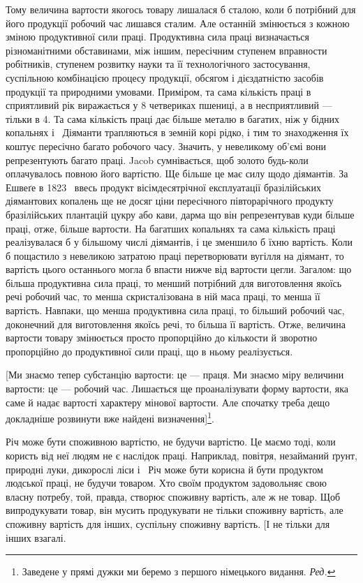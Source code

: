 Тому величина вартости якогось товару лишалася б сталою,
коли б потрібний для його продукції робочий час лишався сталим.
Але останній змінюється з кожною зміною продуктивної
сили праці. Продуктивна сила праці визначається різноманітними
обставинами, між іншим, пересічним ступенем вправности робітників,
ступенем розвитку науки та її технологічного застосування,
суспільною комбінацією процесу продукції, обсягом і дієздатністю
засобів продукції та природними умовами. Приміром, та сама
кількість праці в сприятливий рік виражається у 8 четвериках
пшениці, а в несприятливий — тільки в 4. Та сама кількість праці
дає більше металю в багатих, ніж у бідних копальнях і~
Діяманти трапляються в земній корі рідко, і тим то знаходження
їх коштує пересічно багато робочого часу. Значить, у невеликому
об’ємі вони репрезентують багато праці. Jacob сумнівається, щоб
золото будь-коли оплачувалось повною його вартістю. Ще
більше це має силу щодо діямантів. За Ешвеґе в 1823~ ввесь
продукт вісімдесятрічної експлуатації бразілійських діямантових
копалень ще не досяг ціни пересічного півторарічного продукту
бразілійських плантацій цукру або кави, дарма що він репрезентував
куди більше праці, отже, більше вартости. На багатших
копальнях та сама кількість праці реалізувалася б у більшому
числі діямантів, і це зменшило б їхню вартість. Коли б пощастило
з невеликою затратою праці перетворювати вугілля на діямант,
то вартість цього останнього могла б впасти нижче від вартости
цегли. Загалом: що більша продуктивна сила праці, то менший
потрібний для виготовлення якоїсь речі робочий час, то менша
скристалізована в ній маса праці, то менша її вартість. Навпаки,
що менша продуктивна сила праці, то більший робочий час, доконечний
для виготовлення якоїсь речі, то більша її вартість.
Отже, величина вартости товару змінюється просто пропорційно
до кількости й зворотно пропорційно до продуктивної сили праці,
що в ньому реалізується.

[Ми знаємо тепер субстанцію вартости: це — праця. Ми знаємо
міру величини вартости: це — робочий час. Лишається ще проаналізувати
форму вартости, яка саме й надає вартості характеру
мінової вартости. Але спочатку треба дещо докладніше розвинути
вже найдені визначення]\footnote*{
Заведене у прямі дужки ми беремо з першого німецького видання. \emph{Ред.}
}.

Річ може бути споживною вартістю, не будучи вартістю. Це
маємо тоді, коли користь від неї людям не є наслідок праці. Наприклад,
повітря, незайманий ґрунт, природні луки, дикорослі
ліси і~ Річ може бути корисна й бути продуктом людської
праці, не будучи товаром. Хто своїм продуктом задовольняє свою
власну потребу, той, правда, створює споживну вартість, але ж
не товар. Щоб випродукувати товар, він мусить продукувати не
тільки споживну вартість, але споживну вартість для інших,
суспільну споживну вартість. [І не тільки для інших взагалі.
\parbreak{}  %
